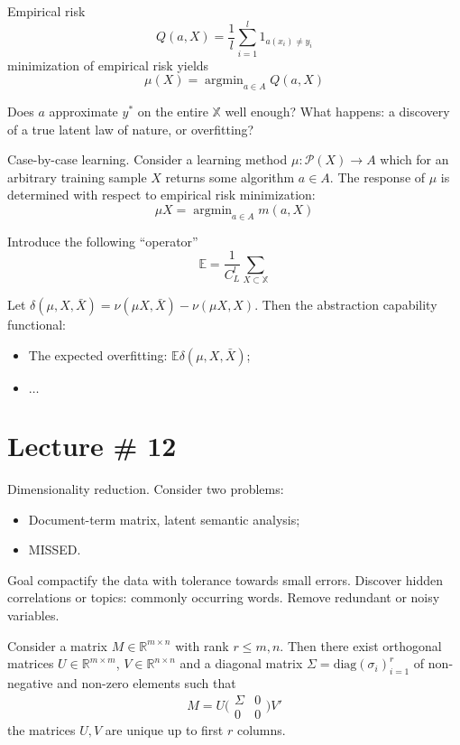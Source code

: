 \documentclass[a4paper]{article}
\newcommand{\Real}{\mathbb{R}}
\newcommand{\argmin}{\mathop{\text{argmin}}}
\begin{document}
Empirical risk
\[Q(a,X) = \frac{1}{l} \sum_{i=1}^l 1_{a(x_i)\neq y_i}\]
minimization of empirical risk yields
\[
\mu(X) = \argmin_{a\in A} Q(a, X)\]

Does $a$ approximate $y^*$ on the entire $\mathbb{X}$ well enough? What happens:
a discovery of a true latent law of nature, or overfitting?

Case-by-case learning. Consider a learning method $\mu:\mathcal{P}(X)\to A$ which
for an arbitrary training sample $X$ returns some algorithm $a\in A$. The response
of $\mu$ is determined with respect to empirical risk minimization:
\[\mu X =\argmin_{a\in A} m(a, X)\]

Introduce the following ``operator''
\[\mathbb{E} = \frac{1}{C^l_L} \sum_{X\subset \mathbb{X}}\]

Let $\delta(\mu,X,\bar{X}) = \nu(\mu X,\bar{X})-\nu(\mu X, X)$. Then the abstraction
capability functional:
\begin{itemize}
	\item The expected overfitting: $\mathbb{E} \delta(\mu,X,\bar{X})$;
	\item $\ldots$
\end{itemize}


\section{Lecture \# 12} %
\label{sec:lecture_12}

Dimensionality reduction.
Consider two problems: \begin{itemize}
	\item Document-term matrix, latent semantic analysis;
	\item MISSED.
\end{itemize}

Goal compactify the data with tolerance towards small errors.
Discover hidden correlations or topics: commonly occurring words.
Remove redundant or noisy variables.

Consider a matrix $M\in \Real^{m\times n}$ with rank $r\leq m,n$. Then there exist
orthogonal matrices $U\in \Real^{m\times m}$, $V\in \Real^{n\times n}$ and
a diagonal matrix $\Sigma = \text{diag}(\sigma_i)_{i=1}^r$ of non-negative and non-zero elements
such that 
\[ M = U \Biggl( \begin{smallmatrix} \Sigma & 0\\0 & 0 \end{smallmatrix} \Biggr) V' \]
the matrices $U,V$ are unique up to first $r$ columns.
\end{document}
